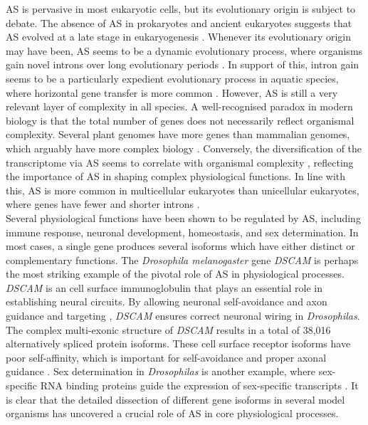AS is pervasive in most eukaryotic cells, but its evolutionary origin is subject to debate. The absence of AS in prokaryotes and ancient eukaryotes suggests that AS evolved at a late stage in eukaryogenesis \cite{Koonin2006-eh}. Whenever its evolutionary origin may have been, AS seems to be a dynamic evolutionary process, where organisms gain novel introns over long evolutionary periods \cite{Knowles2006-zy}. In support of this, intron gain seems to be a particularly expedient evolutionary process in aquatic species, where horizontal gene transfer is more common \cite{Gozashti2022-bz}. However, AS is still a very relevant layer of complexity in all species. A well-recognised paradox in modern biology is that the total number of genes does not necessarily reflect organismal complexity. Several plant genomes have more genes than mammalian genomes, which arguably have more complex biology \cite{Messing2001-wb}. Conversely, the diversification of the transcriptome via AS seems to correlate with organismal complexity \cite{Bush2017-nz}, reflecting the importance of AS in shaping complex physiological functions. In line with this, AS is more common in multicellular eukaryotes than unicellular eukaryotes, where genes have fewer and shorter introns \cite{Marasco2023-kt}. \\

Several physiological functions have been shown to be regulated by AS, including immune response, neuronal development, homeostasis, and sex determination. In most cases, a single gene produces several isoforms which have either distinct or complementary functions. The \textit{Drosophila melanogaster} gene \textit{DSCAM} is perhaps the most striking example of the pivotal role of AS in physiological processes. \textit{DSCAM} is an cell surface immunoglobulin that plays an essential role in establishing neural circuits. By allowing neuronal self-avoidance and axon guidance and targeting \cite{Hattori2008-jd}, \textit{DSCAM} ensures correct neuronal wiring in \textit{Drosophilas}. The complex multi-exonic structure of \textit{DSCAM} results in a total of 38,016 alternatively spliced protein isoforms. These cell surface receptor isoforms have poor self-affinity, which is important for self-avoidance and proper axonal guidance \cite{Wojtowicz2004-df}. Sex determination in \textit{Drosophilas} is another example, where sex-specific RNA binding proteins guide the expression of sex-specific transcripts \cite{Penalva2003-bu}. It is clear that the detailed dissection of different gene isoforms in several model organisms has uncovered a crucial role of AS in core physiological processes. 

